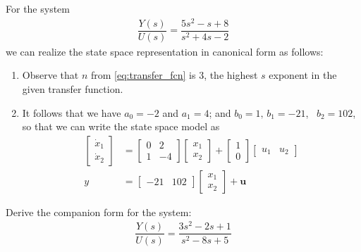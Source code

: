 \begin{example}
	For the system 
	\begin{align}
		\dfrac{Y(s)}{U(s)} = \dfrac{5s^2-s+8}{s^2+4s-2}
	\end{align}
	we can realize the state space representation in canonical form as follows:
	\begin{enumerate}
		\item Observe that $n$ from \eqref{eq:transfer_fcn} is $3$, \ie the highest $s$ exponent in the given transfer function. 
		\item It follows that we have $a_0= -2$ and $a_1 = 4$; and $b_0 = 1, \, b_1=-21$, \, $b_2 = 102$, so that we can write the state space model as
		\begin{align}
			  \begin{bmatrix}
			  \dot{x}_1 
			  \\
			  \dot{x}_2
			  \end{bmatrix} 
			  &=
			  \begin{bmatrix}
			  0 & 2  \\
			  1 & -4 
			  \end{bmatrix}
			  \begin{bmatrix}
			  {x}_1 
			  \\
			  {x}_2
			  \end{bmatrix} 
			  +
			  \begin{bmatrix}
			  1
			  \\
			  0
			  \end{bmatrix} 			  
			  \begin{bmatrix}
			  {u}_1 
			  &
			  {u}_2
			  \end{bmatrix} \nonumber \\
			  y &= \begin{bmatrix}
			  -21 & 102
			  \end{bmatrix}
			  \begin{bmatrix}
			  {x}_1 
			  \\
			  {x}_2
			  \end{bmatrix} 
			  + 
			  \bm{u}
		\end{align}
	\end{enumerate}
\end{example}
%
\begin{homework}
	Derive the companion form for the system:
	\begin{align}
	\dfrac{Y(s)}{U(s)} = \dfrac{3s^2-2s+1}{s^2-8s+5}
	\end{align}
	\label{eq:companion_ex}
\end{homework}

